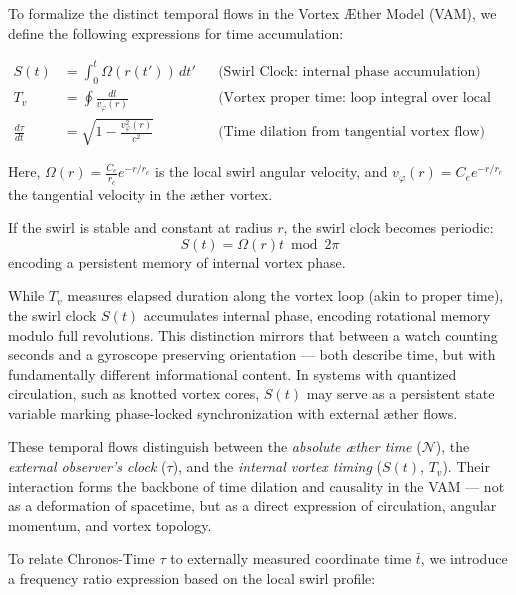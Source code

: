 To formalize the distinct temporal flows in the Vortex Æther Model (VAM), we define the following expressions for time accumulation:

\begin{align}
    S(t) &= \int_0^t \Omega(r(t'))\, dt'
    && \text{(Swirl Clock: internal phase accumulation)} \\
    T_v &= \oint \frac{dl}{v_\varphi(r)}
    && \text{(Vortex proper time: loop integral over local swirl speed)} \\
    \frac{d\tau}{dt} &= \sqrt{1 - \frac{v_\varphi^2(r)}{c^2}}
    && \text{(Time dilation from tangential vortex flow)}
\end{align}

Here, \(\Omega(r) = \frac{C_e}{r_c} e^{-r/r_c}\) is the local swirl angular velocity, and \(v_\varphi(r) = C_e e^{-r/r_c}\) the tangential velocity in the æther vortex.

If the swirl is stable and constant at radius \(r\), the swirl clock becomes periodic:
\[
    S(t) = \Omega(r) t \bmod 2\pi
\]
encoding a persistent memory of internal vortex phase.

\begin{tcolorbox}[colback=gray!5, colframe=black!70, sharp corners=southwest, title=Temporal Phase vs. Duration]
    While \(T_v\) measures elapsed duration along the vortex loop (akin to proper time), the swirl clock \(S(t)\) accumulates internal phase, encoding rotational memory modulo full revolutions. This distinction mirrors that between a watch counting seconds and a gyroscope preserving orientation — both describe time, but with fundamentally different informational content. In systems with quantized circulation, such as knotted vortex cores, \(S(t)\) may serve as a persistent state variable marking phase-locked synchronization with external æther flows.
\end{tcolorbox}


\noindent
These temporal flows distinguish between the \emph{absolute æther time} (\(\mathcal{N}\)), the \emph{external observer’s clock} (\(\tau\)), and the \emph{internal vortex timing} (\(S(t)\), \(T_v\)). Their interaction forms the backbone of time dilation and causality in the VAM — not as a deformation of spacetime, but as a direct expression of circulation, angular momentum, and vortex topology.

\medskip
To relate Chronos-Time $\tau$ to externally measured coordinate time $\bar{t}$, we introduce a frequency ratio expression based on the local swirl profile:

